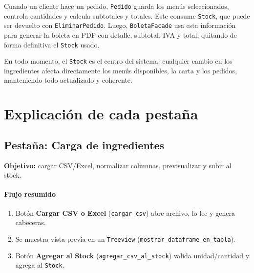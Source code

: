 \documentclass[12pt,a4paper]{article}
\begin{document}
Cuando un cliente hace un pedido, \texttt{Pedido} guarda los menús seleccionados, controla cantidades y calcula subtotales y totales. Este consume \texttt{Stock}, que puede ser devuelto con \texttt{EliminarPedido}. Luego, \texttt{BoletaFacade} usa esta información para generar la boleta en PDF con detalle, subtotal, IVA y total, quitando de forma definitiva el \texttt{Stock} usado.

En todo momento, el \texttt{Stock} es el centro del sistema: cualquier cambio en los ingredientes afecta directamente los menús disponibles, la carta y los pedidos, manteniendo todo actualizado y coherente.


\newpage

\section{Explicación de cada pestaña}

\subsection{Pestaña: Carga de ingredientes}
\textbf{Objetivo:} cargar CSV/Excel, normalizar columnas, previsualizar y subir al stock.

\paragraph{Flujo resumido}
\begin{enumerate}[leftmargin=*]
  \item Botón \textbf{Cargar CSV o Excel} (\texttt{cargar\_csv}) abre archivo, lo lee y genera cabeceras.
  \item Se muestra vista previa en un \texttt{Treeview} (\texttt{mostrar\_dataframe\_en\_tabla}).
  \item Botón \textbf{Agregar al Stock} (\texttt{agregar\_csv\_al\_stock}) valida unidad/cantidad y agrega al \texttt{Stock}.
\end{enumerate}
\end{document}
